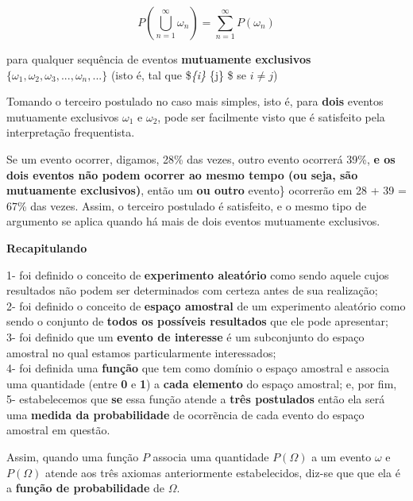 \documentclass[
]{book}
\begin{document}
\[
P\left(\bigcup _{n=1}^{\infty }{\omega}_{n}\right)=\sum _{n=1}^{\infty }P\left({\omega}_{n}\right)
\]

\hfill\break

para qualquer sequência de eventos \textbf{mutuamente exclusivos} \(\{\omega_{1}, \omega_{2}, \omega_{3}, ..., \omega_{n}, ...\}\) (isto é, tal que \$\omega\emph{\{i\} \cap \omega}\{j\} \varnothing \$ se \(i \neq j\))

\hfill\break

Tomando o terceiro postulado no caso mais simples, isto é, para \textbf{dois} eventos mutuamente exclusivos \(\omega_{1}\) e \(\omega_{2}\), pode ser facilmente visto que é satisfeito pela interpretação frequentista.

\hfill\break

Se um evento ocorrer, digamos, 28\% das vezes, outro evento ocorrerá 39\%, \textbf{e os dois eventos não podem ocorrer ao mesmo tempo (ou seja, são mutuamente exclusivos)}, então um \textbf{ou outro} evento\} ocorrerão em 28 + 39 = 67\% das vezes. Assim, o terceiro postulado é satisfeito, e o mesmo tipo de argumento se aplica quando há mais de dois eventos mutuamente exclusivos.

\hfill\break

\textbf{Recapitulando}

\hfill\break

1- foi definido o conceito de \textbf{experimento aleatório} como sendo aquele cujos resultados não podem ser determinados com certeza antes de sua realização;\\
2- foi definido o conceito de \textbf{espaço amostral} de um experimento aleatório como sendo o conjunto de \textbf{todos os possíveis resultados} que ele pode apresentar;\\
3- foi definido que um \textbf{evento de interesse} é um subconjunto do espaço amostral no qual estamos particularmente interessados;\\
4- foi definida uma \textbf{função} que tem como domínio o espaço amostral e associa uma quantidade (entre \textbf{0} e \textbf{1}) a \textbf{cada elemento} do espaço amostral; e, por fim,\\
5- estabelecemos que \textbf{se} essa função atende a \textbf{três postulados} então ela será uma \textbf{medida da probabilidade} de ocorrẽncia de cada evento do espaço amostral em questão.

\hfill\break

Assim, quando uma função \(P\) associa uma quantidade \(P(\Omega)\) a um evento \(\omega\) e \(P(\Omega)\) atende aos três axiomas anteriormente estabelecidos, diz-se que que ela é a \textbf{função de probabilidade} de \(\Omega\).
\end{document}

